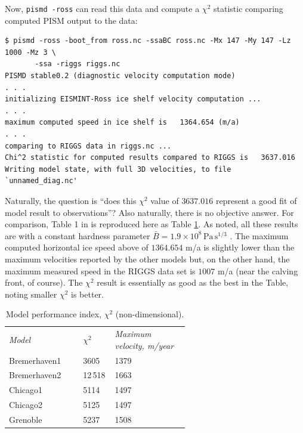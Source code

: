 \documentclass[11pt,final]{amsart}
\begin{document}
Now, \verb|pismd -ross| can read this data and compute a $\chi^2$ statistic comparing computed PISM output to the data:

\small
\begin{verbatim}
$ pismd -ross -boot_from ross.nc -ssaBC ross.nc -Mx 147 -My 147 -Lz 1000 -Mz 3 \
       -ssa -riggs riggs.nc
PISMD stable0.2 (diagnostic velocity computation mode)
. . .
initializing EISMINT-Ross ice shelf velocity computation ...
. . . 
maximum computed speed in ice shelf is   1364.654 (m/a)
. . .
comparing to RIGGS data in riggs.nc ...
Chi^2 statistic for computed results compared to RIGGS is   3637.016
Writing model state, with full 3D velocities, to file `unnamed_diag.nc'
\end{verbatim}
\normalsize

Naturally, the question is ``does this $\chi^2$ value of $3637.016$ represent a good fit of model result to observations''?  Also naturally, there is no objective answer.  For comparison, Table 1 in \cite{MacAyealetal} is reproduced here as Table \ref{tab:chisqr}.  As noted, all these results are with a constant hardness parameter $\bar B = 1.9 \times 10^8 \, \text{Pa}\, \text{s}^{1/3}$ \cite{MacAyealetal}. The maximum computed horizontal ice speed above of $1364.654$ m/a is slightly lower than the maximum velocities reported by the other models but, on the other hand, the maximum measured speed in the RIGGS data set is $1007$ m/a (near the calving front, of course).  The $\chi^2$ result is essentially as good as the best in the Table, noting smaller $\chi^2$ is better.

\small
\begin{table}[ht]
\centering
\caption{Model performance index, $\chi^2$ (non-dimensional).  }\label{tab:chisqr}
\begin{tabular}{p{0.2\linewidth}p{0.1\linewidth}p{0.3\linewidth}}\hline
\textsl{Model} & $\chi^2$ & \textsl{Maximum velocity, m/year} \\
Bremerhaven1 & 3605 & 1379 \\
Bremerhaven2 & 12\,518 & 1663 \\
Chicago1 & 5114 & 1497 \\
Chicago2 & 5125 & 1497 \\
Grenoble & 5237 & 1508 \\
\hline
\end{tabular}
\end{table}
\normalsize
\end{document}
